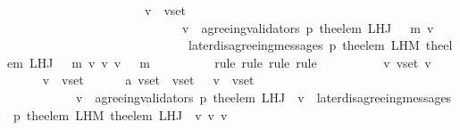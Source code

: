 \begin{isabellebody}
\ \ \ \ \ \ \ \ \ \ \ \ \ \ \ \ \ \ \ \ {\isasymlongrightarrow}\ {\isacharparenleft}{\isasymforall}\ v{\isacharprime}\ {\isasymin}\ v{\isacharunderscore}set{\isacharprime}{\isachardot}\ \isanewline
\ \ \ \ \ \ \ \ \ \ \ \ \ \ \ \ \ \ \ \ \ \ \ \ \ \ \ \ v{\isacharprime}\ {\isasymin}\ agreeing{\isacharunderscore}validators\ {\isacharparenleft}p{\isacharcomma}\ {\isacharparenleft}the{\isacharunderscore}elem\ {\isacharparenleft}L{\isacharunderscore}H{\isacharunderscore}J\ {\isacharparenleft}{\isasymsigma}\ {\isasymunion}\ {\isacharbraceleft}m{\isacharbraceright}{\isacharparenright}\ v{\isacharparenright}{\isacharparenright}{\isacharparenright}\isanewline
\ \ \ \ \ \ \ \ \ \ \ \ \ \ \ \ \ \ \ \ \ \ \ \ \ \ \ \ {\isasymand}\ later{\isacharunderscore}disagreeing{\isacharunderscore}messages\ {\isacharparenleft}p{\isacharcomma}\ the{\isacharunderscore}elem\ {\isacharparenleft}L{\isacharunderscore}H{\isacharunderscore}M\ {\isacharparenleft}the{\isacharunderscore}elem\ {\isacharparenleft}L{\isacharunderscore}H{\isacharunderscore}J\ {\isacharparenleft}{\isasymsigma}\ {\isasymunion}\ {\isacharbraceleft}m{\isacharbraceright}{\isacharparenright}\ v{\isacharparenright}{\isacharparenright}\ v{\isacharprime}{\isacharparenright}{\isacharcomma}\ v{\isacharprime}{\isacharcomma}\ {\isacharparenleft}{\isasymsigma}\ {\isasymunion}\ {\isacharbraceleft}m{\isacharbraceright}{\isacharparenright}{\isacharparenright}\ {\isacharequal}\ {\isasymemptyset}{\isacharparenright}{\isacharparenright}{\isachardoublequoteclose}\ \ \isanewline
\ \ \ \ \isamarkupfalse%
\ {\isacharparenleft}rule{\isacharcomma}\ rule{\isacharcomma}\ rule{\isacharcomma}\ rule{\isacharparenright}\isanewline
\ \ \isamarkupfalse%
\ {\isacharminus}\isanewline
\ \ \ \ \isamarkupfalse%
\ v\ v{\isacharunderscore}set{\isacharprime}\ v{\isacharprime}\isanewline
\ \ \ \ \isamarkupfalse%
\ {\isachardoublequoteopen}v\ {\isasymin}\ v{\isacharunderscore}set{\isachardoublequoteclose}\ \isanewline
\ \ \ \ \ a{}{\isacharcolon}\ {\isachardoublequoteopen}v{\isacharunderscore}set{\isacharprime}\ {\isasymsubseteq}\ v{\isacharunderscore}set\ {\isasymand}\ {\isacharparenleft}{\isasymforall}\ v{\isacharprime}\ {\isasymin}\ v{\isacharunderscore}set{\isacharprime}{\isachardot}\isanewline
\ \ \ \ \ \ \ \ \ \ \ v{\isacharprime}\ {\isasymin}\ agreeing{\isacharunderscore}validators\ {\isacharparenleft}p{\isacharcomma}\ the{\isacharunderscore}elem\ {\isacharparenleft}L{\isacharunderscore}H{\isacharunderscore}J\ {\isasymsigma}\ v{\isacharparenright}{\isacharparenright}\ {\isasymand}\ later{\isacharunderscore}disagreeing{\isacharunderscore}messages\ {\isacharparenleft}p{\isacharcomma}\ the{\isacharunderscore}elem\ {\isacharparenleft}L{\isacharunderscore}H{\isacharunderscore}M\ {\isacharparenleft}the{\isacharunderscore}elem\ {\isacharparenleft}L{\isacharunderscore}H{\isacharunderscore}J\ {\isasymsigma}\ v{\isacharparenright}{\isacharparenright}\ v{\isacharprime}{\isacharparenright}{\isacharcomma}\ v{\isacharprime}{\isacharcomma}\ {\isasymsigma}{\isacharparenright}\ {\isacharequal}\ {\isasymemptyset}{\isacharparenright}{\isachardoublequoteclose}\ \isanewline

\end{isabellebody}

